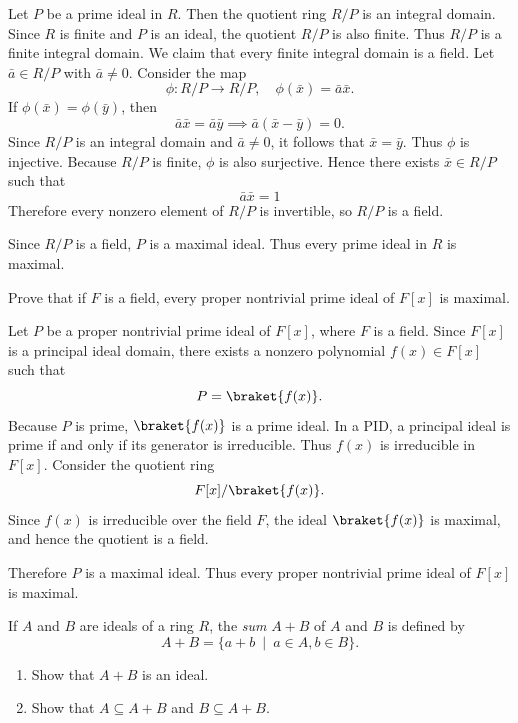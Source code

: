 \begin{solution}
  Let $P$ be a prime ideal in $R$. Then the quotient ring $R/P$ is an integral domain. Since $R$ is finite and $P$ is an ideal, the quotient $R/P$ is also finite. Thus $R/P$ is a finite integral domain. We claim that every finite integral domain is a field. Let $\bar{a} \in R/P$ with $\bar{a} \neq 0$. Consider the map
  \[%
    \phi : R/P \to R/P, \quad \phi(\bar{x}) = \bar{a}\bar{x}
  .\]%
  If $\phi(\bar{x}) = \phi(\bar{y})$, then
  \[%
    \bar{a}\bar{x} = \bar{a}\bar{y} \implies \bar{a}(\bar{x} - \bar{y}) = 0
  .\]%
  Since $R/P$ is an integral domain and $\bar{a} \neq 0$, it follows that $\bar{x} = \bar{y}$. Thus $\phi$ is injective. Because $R/P$ is finite, $\phi$ is also surjective. Hence there exists $\bar{x} \in R/P$ such that
  \[%
    \bar{a}\bar{x} = 1
  \]%
  Therefore every nonzero element of $R/P$ is invertible, so $R/P$ is a field.

  Since $R/P$ is a field, $P$ is a maximal ideal. Thus every prime ideal in $R$ is maximal.
\end{solution}

\begin{problem}[31.32]
  Prove that if $F$ is a field, every proper nontrivial prime ideal of $F[x]$ is maximal.
\end{problem}

\begin{solution}
  Let $P$ be a proper nontrivial prime ideal of $F[x]$, where $F$ is a field. Since $F[x]$ is a principal ideal domain, there exists a nonzero polynomial $f(x) \in F[x]$ such that
  \[%
    P = \braket{f(x)}
  .\]%
  Because $P$ is prime, $\braket{f(x)}$ is a prime ideal. In a PID, a principal ideal is prime if and only if its generator is irreducible. Thus $f(x)$ is irreducible in $F[x]$. Consider the quotient ring
  \[%
    F[x]/\braket{f(x)}
  .\]%
  Since $f(x)$ is irreducible over the field $F$, the ideal $\braket{f(x)}$ is maximal, and hence the quotient is a field.

  Therefore $P$ is a maximal ideal. Thus every proper nontrivial prime ideal of $F[x]$ is maximal.
\end{solution}

\begin{problem}[31.36]
  If $A$ and $B$ are ideals of a ring $R$, the \textit{sum} $A + B$ of $A$ and $B$ is defined by
  \[%
    A + B = \{a + b~\mid~a \in A, b \in B\}%
  .\]%
  \begin{enumerate}
    \item Show that $A + B$ is an ideal.
    \item Show that $A \subseteq A + B$ and $B \subseteq A + B$.
  \end{enumerate}
\end{problem}


